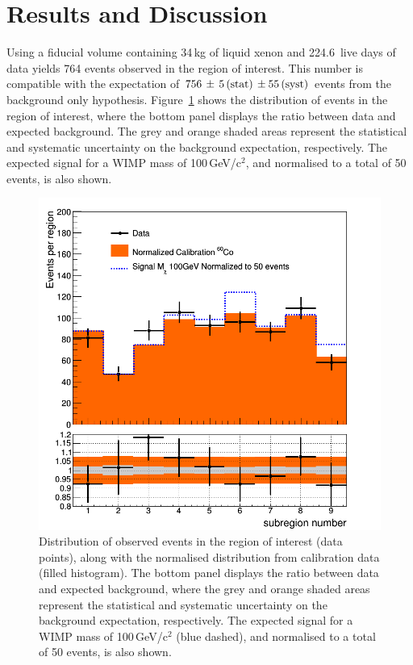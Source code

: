 \section{Results and Discussion}
\label{sec:results}

Using a fiducial volume containing 34\,kg of liquid xenon and 224.6~live days of data yields 764 events observed  in the region of interest.
This number is compatible with the expectation of $756 \, \pm \, 5 \,{\rm (stat)} \, \pm 55\, {\rm (syst)}$ events from the background only hypothesis. 
Figure~\ref{fig:dataVSbkg} shows the distribution of  events  in the region of interest, where the bottom panel displays the ratio
between data and expected background. The grey and orange shaded areas represent the statistical and systematic uncertainty 
on the background expectation, respectively. The expected signal for a WIMP mass of 100\,GeV/c$^2$, and normalised to a total of 50 events, is also shown.


\begin{figure}[t!]
  \includegraphics[width=\linewidth]{images/data_vs_bkg.png}
  \caption{Distribution of  observed events  in the region of interest (data points), along with the normalised distribution from calibration data (filled histogram). The bottom panel displays the ratio
between data and expected background, where the grey and orange shaded areas represent the statistical and systematic uncertainty 
on the background expectation, respectively. The expected signal for a WIMP mass of 100\,GeV/c$^2$ (blue dashed), and normalised to a total of 50 events, is also shown.}
  \label{fig:dataVSbkg}
\end{figure}

